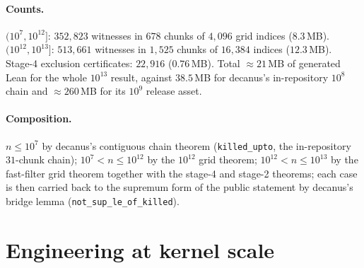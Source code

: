 \documentclass[11pt]{article}
\begin{document}
\paragraph{Counts.} $(10^{7},10^{12}]$: $352{,}823$ witnesses in $678$ chunks of $4{,}096$ grid indices ($8.3$\,MB). $(10^{12},10^{13}]$: $513{,}661$ witnesses in $1{,}525$ chunks of $16{,}384$ indices ($12.3$\,MB). Stage-4 exclusion certificates: $22{,}916$ ($0.76$\,MB). Total $\approx21$\,MB of generated Lean for the whole $10^{13}$ result, against $38.5$\,MB for decanus's in-repository $10^{8}$ chain and $\approx260$\,MB for its $10^{9}$ release asset.

\paragraph{Composition.} $n\le10^{7}$ by decanus's contiguous chain theorem (\texttt{killed\_upto}, the in-repository $31$-chunk chain); $10^{7}<n\le10^{12}$ by the $10^{12}$ grid theorem; $10^{12}<n\le10^{13}$ by the fast-filter grid theorem together with the stage-4 and stage-2 theorems; each case is then carried back to the supremum form of the public statement by decanus's bridge lemma (\texttt{not\_sup\_le\_of\_killed}).

\section{Engineering at kernel scale}\label{sec:eng}
\end{document}
